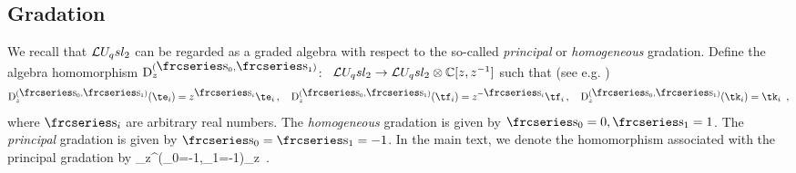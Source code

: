 \documentclass[11pt]{amsart}
\numberwithin{equation}{section}
\numberwithin{equation}{section}
\begin{document}
\begin{appendix}
	\subsection{Gradation}\label{sec:grad}
We recall that	$\mathcal{L} U_q sl_2$ can be regarded as a graded algebra with respect to the so-called {\it principal} or {\it homogeneous} gradation.   Define the algebra homomorphism ${\rm D}^{(\sfr_0,\sfr_1)}_z$:~
	$\mathcal{L} U_q sl_2 \rightarrow \mathcal{L} U_q sl_2\otimes {\mathbb C}[z,z^{-1}]$ 
	such that (see e.g. \cite{grad})
	\begin{equation}
		{\rm D}^{(\sfr_0,\sfr_1)}_z(\te_i)=z^{\sfr_i} \te_i\,,~~~{\rm D}^{(\sfr_0,\sfr_1)}_z(\tf_i)=z^{-\sfr_i}\tf_i\,,
		~~~{\rm D}^{(\sfr_0,\sfr_1)}_z(\tk_i)=\tk_i\,\label{general-g1}\ ,
	\end{equation}
%
	where $\sfr_i$ are arbitrary real numbers.
	The {\it homogeneous} gradation is given by $\sfr_0=0,\sfr_1=1$. The {\it principal} gradation is given by $\sfr_0=\sfr_1=-1$. In the main text, we denote the homomorphism associated with the principal gradation by 
	\beqa
	\phi_{z}^{(\sfr_0=-1,\sfr_1=-1)}_z\ . \label{gradp}
	\eeqa


\end{appendix}
\end{document}
